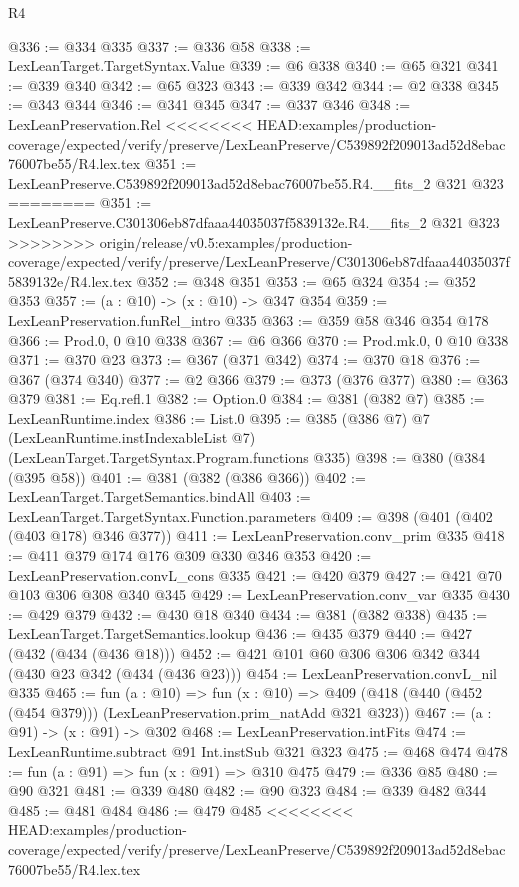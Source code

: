 \begin{lexlean}{R4}
\begin{coremodule}
{{{{{{{{{{{{{{{{{{{{@336 := @334 @335
@337 := @336 @58
@338 := LexLeanTarget.TargetSyntax.Value
@339 := @6 @338
@340 := @65 @321
@341 := @339 @340
@342 := @65 @323
@343 := @339 @342
@344 := @2 @338
@345 := @343 @344
@346 := @341 @345
@347 := @337 @346
@348 := LexLeanPreservation.Rel
<<<<<<<< HEAD:examples/production-coverage/expected/verify/preserve/LexLeanPreserve/C539892f209013ad52d8ebac76007be55/R4.lex.tex
@351 := LexLeanPreserve.C539892f209013ad52d8ebac76007be55.R4.__fits_2 @321 @323
========
@351 := LexLeanPreserve.C301306eb87dfaaa44035037f5839132e.R4.__fits_2 @321 @323
>>>>>>>> origin/release/v0.5:examples/production-coverage/expected/verify/preserve/LexLeanPreserve/C301306eb87dfaaa44035037f5839132e/R4.lex.tex
@352 := @348 @351
@353 := @65 @324
@354 := @352 @353
@357 := (a : @10) -> (x : @10) -> @347 @354
@359 := LexLeanPreservation.funRel_intro @335
@363 := @359 @58 @346 @354 @178
@366 := Prod.{0, 0} @10 @338
@367 := @6 @366
@370 := Prod.mk.{0, 0} @10 @338
@371 := @370 @23
@373 := @367 (@371 @342)
@374 := @370 @18
@376 := @367 (@374 @340)
@377 := @2 @366
@379 := @373 (@376 @377)
@380 := @363 @379
@381 := Eq.refl.{1}
@382 := Option.{0}
@384 := @381 (@382 @7)
@385 := LexLeanRuntime.index
@386 := List.{0}
@395 := @385
    (@386 @7)
    @7
    (LexLeanRuntime.instIndexableList @7)
    (LexLeanTarget.TargetSyntax.Program.functions @335)
@398 := @380 (@384 (@395 @58))
@401 := @381 (@382 (@386 @366))
@402 := LexLeanTarget.TargetSemantics.bindAll
@403 := LexLeanTarget.TargetSyntax.Function.parameters
@409 := @398 (@401 (@402 (@403 @178) @346 @377))
@411 := LexLeanPreservation.conv_prim @335
@418 := @411 @379 @174 @176 @309 @330 @346 @353
@420 := LexLeanPreservation.convL_cons @335
@421 := @420 @379
@427 := @421 @70 @103 @306 @308 @340 @345
@429 := LexLeanPreservation.conv_var @335
@430 := @429 @379
@432 := @430 @18 @340
@434 := @381 (@382 @338)
@435 := LexLeanTarget.TargetSemantics.lookup
@436 := @435 @379
@440 := @427 (@432 (@434 (@436 @18)))
@452 := @421 @101 @60 @306 @306 @342 @344 (@430 @23 @342 (@434 (@436 @23)))
@454 := LexLeanPreservation.convL_nil @335
@465 := fun (a : @10) =>
  fun (x : @10) => @409 (@418 (@440 (@452 (@454 @379))) (LexLeanPreservation.prim_natAdd @321 @323))
@467 := (a : @91) -> (x : @91) -> @302
@468 := LexLeanPreservation.intFits
@474 := LexLeanRuntime.subtract @91 Int.instSub @321 @323
@475 := @468 @474
@478 := fun (a : @91) => fun (x : @91) => @310 @475
@479 := @336 @85
@480 := @90 @321
@481 := @339 @480
@482 := @90 @323
@484 := @339 @482 @344
@485 := @481 @484
@486 := @479 @485
<<<<<<<< HEAD:examples/production-coverage/expected/verify/preserve/LexLeanPreserve/C539892f209013ad52d8ebac76007be55/R4.lex.tex
}}}}}}}}}}}}}}}}}}}}
\end{coremodule}
\end{lexlean}
